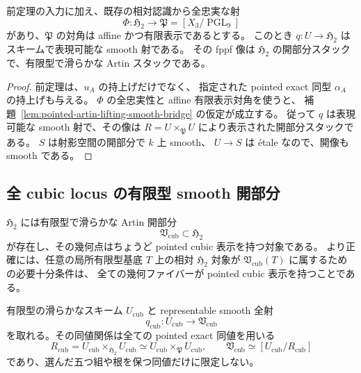 \begin{corollary}
\label{cor:quintuple-effective-smooth-chart}
前定理の入力に加え、既存の相対認識から全忠実な射
\[
 \Phi:\mathfrak H_2\longrightarrow\mathfrak P=[X_3/\operatorname{PGL}_9]
\]
があり、$\mathfrak P$ の対角は affine かつ有限表示であるとする。
このとき $q:U\to\mathfrak H_2$ はスキームで表現可能な smooth 射である。
その fppf 像は $\mathfrak H_2$ の開部分スタックで、有限型で滑らかな Artin スタックである。
\end{corollary}

\begin{proof}
前定理は、$u_A$ の持上げだけでなく、
指定された pointed exact 同型 $\alpha_A$ の持上げも与える。
$\Phi$ の全忠実性と affine 有限表示対角を使うと、
補題~\ref{lem:pointed-artin-lifting-smooth-bridge} の仮定が成立する。
従って $q$ は表現可能な smooth 射で、その像は
$R=U\times_{\mathfrak P}U$ により表示された開部分スタックである。
$S$ は射影空間の開部分で $k$ 上 smooth、
$U\to S$ は étale なので、開像も smooth である。
\end{proof}

\subsection{全 cubic locus の有限型 smooth 開部分}

\begin{theorem}
\label{thm:cubic-smooth-open}
$\mathfrak H_2$ には有限型で滑らかな Artin 開部分
\[
 \mathfrak V_{\mathrm{cub}}\subset\mathfrak H_2
\]
が存在し、その幾何点はちょうど pointed cubic 表示を持つ対象である。
より正確には、任意の局所有限型基底 $T$ 上の相対 $\mathfrak H_2$ 対象が
$\mathfrak V_{\mathrm{cub}}(T)$ に属するための必要十分条件は、
全ての幾何ファイバーが pointed cubic 表示を持つことである。

有限型の滑らかなスキーム $U_{\mathrm{cub}}$ と representable smooth 全射
\[
 q_{\mathrm{cub}}:U_{\mathrm{cub}}\longrightarrow\mathfrak V_{\mathrm{cub}}
\]
を取れる。その同値関係は全ての pointed exact 同値を用いる
\[
 R_{\mathrm{cub}}=U_{\mathrm{cub}}\times_{\mathfrak H_2}U_{\mathrm{cub}}
 \simeq U_{\mathrm{cub}}\times_{\mathfrak P}U_{\mathrm{cub}},\qquad
 \mathfrak V_{\mathrm{cub}}\simeq[U_{\mathrm{cub}}/R_{\mathrm{cub}}]
\]
であり、選んだ五つ組や根を保つ同値だけに限定しない。
\end{theorem}

